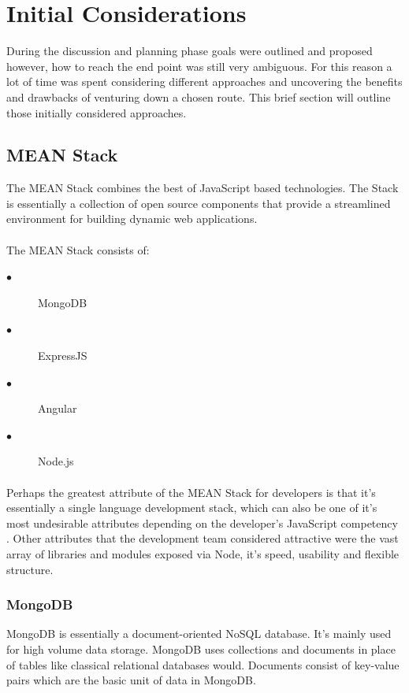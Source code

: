 \section{Initial Considerations}
During the discussion and planning phase goals were outlined and proposed however, how to reach the end point was still very ambiguous. For this reason a lot of time was spent considering different approaches and uncovering the benefits and drawbacks of venturing down a chosen route. This brief section will outline those initially considered approaches.
\subsection{MEAN Stack}
The MEAN Stack combines the best of JavaScript based technologies. The Stack is essentially a collection of open source components that provide a streamlined environment for building dynamic web applications. 

\paragraph{}
The MEAN Stack consists of:

\begin{description}
  \item[$\bullet$] MongoDB
  \item[$\bullet$] ExpressJS
  \item[$\bullet$] Angular
  \item[$\bullet$] Node.js
\end{description}

\paragraph{}
Perhaps the greatest attribute of the MEAN Stack for developers is that it's essentially a single language development stack, which can also be one of it's most undesirable attributes depending on the developer's JavaScript competency \cite{MEAN_STACK}. Other attributes that the development team considered attractive were the vast array of libraries and modules exposed via Node, it's speed, usability and flexible structure. 

\subsubsection{MongoDB}
MongoDB is essentially a document-oriented NoSQL database. It's mainly used for high volume data storage. MongoDB uses collections and documents in place of tables like classical relational databases would. Documents consist of key-value pairs which are the basic unit of data in MongoDB.

